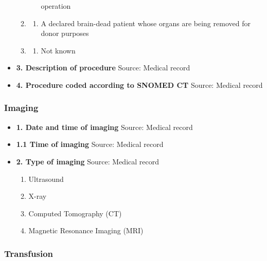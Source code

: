 \documentclass[
]{scrartcl}
\providecommand{\tightlist}{%
  \setlength{\itemsep}{0pt}\setlength{\parskip}{0pt}}\usepackage{longtable,booktabs,array}
\begin{document}
\begin{itemize}
\begin{enumerate}
\begin{enumerate}
      operation
    \end{enumerate}
  \item
    \begin{enumerate}
    \def\labelenumii{\arabic{enumii}.}
    \setcounter{enumii}{5}
    \tightlist
    \item
      A declared brain-dead patient whose organs are being removed for
      donor purposes
    \end{enumerate}
  \item
    \begin{enumerate}
    \def\labelenumii{\arabic{enumii}.}
    \setcounter{enumii}{998}
    \tightlist
    \item
      Not known
    \end{enumerate}
  \end{enumerate}
\item
  \textbf{3. Description of procedure} Source: Medical record
\item
  \textbf{4. Procedure coded according to SNOMED CT} Source: Medical
  record
\end{itemize}

\hypertarget{imaging}{%
\subsubsection{Imaging}\label{imaging}}

\begin{itemize}
\item
  \textbf{1. Date and time of imaging} Source: Medical record
\item
  \textbf{1.1 Time of imaging} Source: Medical record
\item
  \textbf{2. Type of imaging} Source: Medical record

  \begin{enumerate}
  \def\labelenumi{\arabic{enumi}.}
  \tightlist
  \item
    Ultrasound
  \item
    X-ray
  \item
    Computed Tomography (CT)
  \item
    Magnetic Resonance Imaging (MRI)
  \end{enumerate}
\end{itemize}

\hypertarget{transfusion}{%
\subsubsection{Transfusion}\label{transfusion}}
\end{document}
